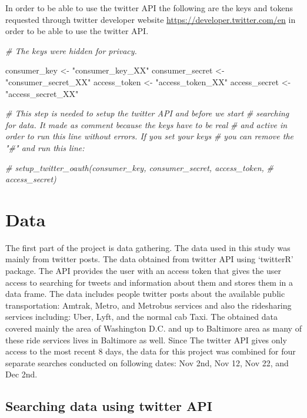 \documentclass[
  12pt,
]{article}
\newenvironment{Shaded}{\begin{snugshade}}{\end{snugshade}}
\newcommand{\CommentTok}[1]{\textcolor[rgb]{0.56,0.35,0.01}{\textit{#1}}}
\newcommand{\NormalTok}[1]{#1}
\newcommand{\StringTok}[1]{\textcolor[rgb]{0.31,0.60,0.02}{#1}}
\begin{document}
In order to be able to use the twitter API the following are the keys
and tokens requested through twitter developer website
\url{https://developer.twitter.com/en} in order to be able to use the
twitter API.

\begin{Shaded}
\begin{Highlighting}[]
\CommentTok{# The keys were hidden for privacy.}

\NormalTok{consumer_key <-}\StringTok{ "consumer_key_XX"}
\NormalTok{consumer_secret <-}\StringTok{ "consumer_secret_XX"}
\NormalTok{access_token <-}\StringTok{ "access_token_XX"}
\NormalTok{access_secret <-}\StringTok{ "access_secret_XX"}

\CommentTok{# This step is needed to setup the twitter API and before we start }
\CommentTok{# searching for data. It made as comment because the keys have to be real }
\CommentTok{# and active in order to run this line without errors. If you set your keys }
\CommentTok{# you can remove the "#" and run this line: }

\CommentTok{# setup_twitter_oauth(consumer_key, consumer_secret, access_token, }
\CommentTok{#                     access_secret)}
\end{Highlighting}
\end{Shaded}

\hypertarget{data}{%
\section{Data}\label{data}}

The first part of the project is data gathering. The data used in this
study was mainly from twitter posts. The data obtained from twitter API
using `twitterR' package. The API provides the user with an access token
that gives the user access to searching for tweets and information about
them and stores them in a data frame. The data includes people twitter
posts about the available public transportation: Amtrak, Metro, and
Metrobus services and also the ridesharing services including: Uber,
Lyft, and the normal cab Taxi. The obtained data covered mainly the area
of Washington D.C. and up to Baltimore area as many of these ride
services lives in Baltimore as well. Since The twitter API gives only
access to the most recent 8 days, the data for this project was combined
for four separate searches conducted on following dates: Nov 2nd, Nov
12, Nov 22, and Dec 2nd.

\hypertarget{searching-data-using-twitter-api}{%
\subsection{Searching data using twitter
API}\label{searching-data-using-twitter-api}}
\end{document}
